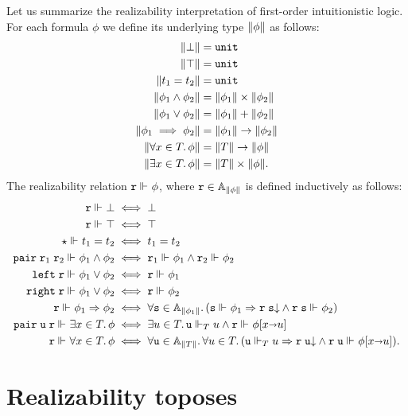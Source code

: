 Let us summarize the realizability interpretation of first-order
intuitionistic logic. For each formula $\phi$ we define its underlying
type $\T{\phi}$ as follows:
%
\begin{align*}
  \T{\bot} &= \unit \\
  \T{\top} &= \unit \\
  \T{t_1 = t_2} &= \unit \\
  \T{\phi_1 \land \phi_2} &= \T{\phi_1} \times \T{\phi_2}\\
  \T{\phi_1 \lor \phi_2} &= \T{\phi_1} + \T{\phi_2}\\
  \T{\phi_1 \implies \phi_2} &= \T{\phi_1} \to \T{\phi_2}\\
  \T{\all{x \in T}{\phi}} &= \T{T} \to \T{\phi} \\
  \T{\some{x \in T}{\phi}} &= \T{T} \times \T{\phi}.
\end{align*}
%
The realizability relation $\R{r} \rz \phi$, where $\R{r} \in
\Atyp{\T{\phi}}$ is defined inductively as follows:
%
\begin{align*}
  \R{r} \rz \bot &\iff \bot\\
  \R{r} \rz \top &\iff \top\\
  \ttunit \rz t_1 = t_2 &\iff t_1 = t_2\\
  \combPair\;\R{r}_1\;\R{r}_2 \rz \phi_1 \land \phi_2 &\iff
  \R{r}_1 \rz \phi_1 \land \R{r}_2 \rz \phi_2\\
  \combLeft\;\R{r} \rz \phi_1 \lor \phi_2 &\iff \R{r} \rz \phi_1\\
  \combRight\;\R{r} \rz \phi_1 \lor \phi_2 &\iff \R{r} \rz \phi_2\\
  \R{r} \rz \phi_1 \lthen \phi_2 &\iff
  \all{\R{s} \in \Atyp{\T{\phi_1}}} (\R{s} \rz \phi_1 \lthen
    \defined{\R{r}\;\R{s}} \land \R{r}\;\R{s} \rz \phi_2)
  \\
  \combPair\;\R{u}\;\R{r} \rz \some{x \in T}{\phi} &\iff
  \some{u \in T} \R{u} \rz[T] u \land \R{r} \rz \subst{\phi}{x \subto u}
  \\
  \R{r} \rz \all{x \in T}{\phi} &\iff
  \all{\R{u} \in \Atyp{\T{T}}}{
    \all{u \in T}
      (\R{u} \rz[T] u \lthen
      \defined{\R{r}\;\R{u}} \land \R{r}\;\R{u} \rz \subst{\phi}{x \subto u})
    }.
\end{align*}
%

\section{Realizability toposes}
\label{sec:realizability-toposes}


